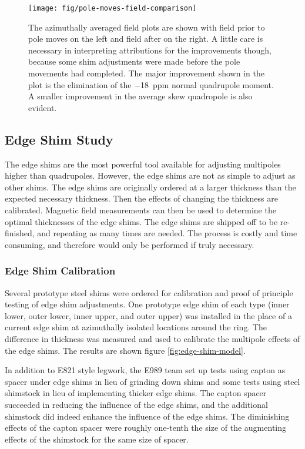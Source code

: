 \begin{figure}
\centering
\texttt{[image: fig/pole-moves-field-comparison]}
\caption{
    The azimuthally averaged field plots are shown with field prior to pole moves on the left and field after on the right.  A little care is necessary in interpreting attributions for the improvements though, because some shim adjustments were made before the pole movements had completed.  The major improvement shown in the plot is the elimination of the \SI{-18}{ppm} normal quadrupole moment.  A smaller improvement in the average skew quadropole is also evident. 
    \label{fig:pole-moves-field-comparison}
}
\end{figure}

\subsection{Edge Shim Study}

The edge shims are the most powerful tool available for adjusting multipoles higher than quadrupoles.  However, the edge shims are not as simple to adjust as other shims.  The edge shims are originally ordered at a larger thickness than the expected necessary thickness.  Then the effects of changing the thickness are calibrated.  Magnetic field measurements can then be used to determine the optimal thicknesses of the edge shims.  The edge shims are shipped off to be re-finished, and repeating as many times are needed.  The process is costly and time consuming, and therefore would only be performed if truly necessary.

\subsubsection{Edge Shim Calibration}

Several prototype steel shims were ordered for calibration and proof of principle testing of edge shim adjustments.  One prototype edge shim of each type (inner lower, outer lower, inner upper, and outer upper) was installed in the place of a current edge shim at azimuthally isolated locations around the ring.  The difference in thickness was measured and used to calibrate the multipole effects of the edge shims.  The results are shown figure \ref{fig:edge-shim-model}. 

In addition to E821 style legwork, the E989 team set up tests using capton as spacer under edge shims in lieu of grinding down shims and some tests using steel shimstock in lieu of implementing thicker edge shims.  The capton spacer succeeded in reducing the influence of the edge shims, and the additional shimstock did indeed enhance the influence of the edge shims.  The diminishing effects of the capton spacer were roughly one-tenth the size of the augmenting effects of the shimstock for the same size of spacer.

